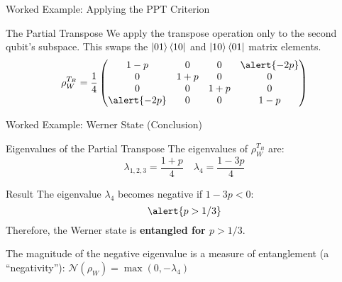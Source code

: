 \begin{frame}{Worked Example: Applying the PPT Criterion}
  \begin{block}{The Partial Transpose}
    We apply the transpose operation only to the second qubit's subspace.
    This swaps the $\ket{01}\bra{10}$ and $\ket{10}\bra{01}$ matrix elements.
    \[
      \rho_W^{T_B} = \frac{1}{4}
      \begin{pmatrix}
        1-p & 0 & 0 & \alert{-2p} \\
        0 & 1+p & 0 & 0 \\
        0 & 0 & 1+p & 0 \\
        \alert{-2p} & 0 & 0 & 1-p
      \end{pmatrix}
    \]
  \end{block}
\end{frame}

\begin{frame}{Worked Example: Werner State (Conclusion)}
  \begin{block}{Eigenvalues of the Partial Transpose}
    The eigenvalues of $\rho_W^{T_B}$ are:
    \begin{equation}
      \lambda_{1,2,3} = \frac{1+p}{4} \quad \lambda_4 = \frac{1-3p}{4}
    \end{equation}
  \end{block}
  \vspace{-1em}
  \pause
  \begin{alertblock}{Result}
    The eigenvalue $\lambda_4$ becomes negative if $1-3p < 0$:
    \[ \alert{p > 1/3} \]
    Therefore, the Werner state is \textbf{entangled for $p > 1/3$}.
    \pause

    The magnitude of the negative eigenvalue is a measure of entanglement
    (a ``negativity''):
    \( \mathcal{N}(\rho_W) = \max\left(0, -\lambda_4\right) \)
  \end{alertblock}
\end{frame}

